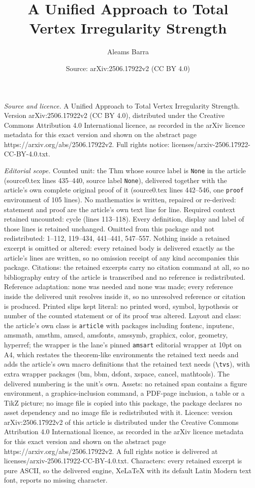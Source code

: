 \documentclass[10pt,a4paper]{amsart}
\title[A Unified Approach to Total Vertex Irregularity Strength]{A Unified Approach to Total Vertex Irregularity Strength}
\author{Aleams Barra}
\date{Source: arXiv:2506.17922v2 (CC BY 4.0)}
\begin{document}
\maketitle

\noindent\emph{Source and licence.} A Unified Approach to Total Vertex Irregularity Strength. Version arXiv:2506.17922v2 (CC BY 4.0), distributed under the Creative Commons Attribution 4.0 International licence, as recorded in the arXiv licence metadata for this exact version and shown on the abstract page https://arxiv.org/abs/2506.17922v2. Full rights notice: licenses/arxiv-2506.17922-CC-BY-4.0.txt.\par\smallskip

\noindent\textit{Editorial scope.} Counted unit: the Thm whose source label is \texttt{None} in the article (source0.tex lines 435--440, source label \texttt{None}), delivered together with the article's own complete original proof of it (source0.tex lines 442--546, one \texttt{proof} environment of 105 lines). No mathematics is written, repaired or re-derived: statement and proof are the article's own text line for line. Required context retained uncounted: cycle (lines 113--118). Every definition, display and label of those lines is retained unchanged. Omitted from this package and not redistributed: 1--112, 119--434, 441--441, 547--557. Nothing inside a retained excerpt is omitted or altered: every retained body is delivered exactly as the article's lines are written, so no omission receipt of any kind accompanies this package. Citations: the retained excerpts carry no citation command at all, so no bibliography entry of the article is transcribed and no reference is redistributed. Reference adaptation: none was needed and none was made; every reference inside the delivered unit resolves inside it, so no unresolved reference or citation is produced. Printed slips kept literal: no printed word, symbol, hypothesis or number of the counted statement or of its proof was altered. Layout and class: the article's own class is \texttt{article} with packages including fontenc, inputenc, amsmath, amsthm, amscd, amsfonts, amssymb, graphicx, color, geometry, hyperref; the wrapper is the lane's pinned \texttt{amsart} editorial wrapper at 10pt on A4, which restates the theorem-like environments the retained text needs and adds the article's own macro definitions that the retained text needs (\texttt{\textbackslash tvs}), with extra wrapper packages (bm, bbm, dsfont, xspace, cancel, mathtools). The delivered numbering is the unit's own. Assets: no retained span contains a figure environment, a graphics-inclusion command, a PDF-page inclusion, a table or a TikZ picture; no image file is copied into this package, the package declares no asset dependency and no image file is redistributed with it. Licence: version arXiv:2506.17922v2 of this article is distributed under the Creative Commons Attribution 4.0 International licence, as recorded in the arXiv licence metadata for this exact version and shown on the abstract page https://arxiv.org/abs/2506.17922v2. A full rights notice is delivered at licenses/arxiv-2506.17922-CC-BY-4.0.txt. Characters: every retained excerpt is pure ASCII, so the delivered engine, XeLaTeX with its default Latin Modern text font, reports no missing character.
\end{document}
